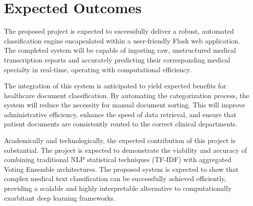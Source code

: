 \chapter{Expected Outcomes}
The proposed project is expected to successfully deliver a robust, automated classification engine encapsulated within a user-friendly Flask web application. The completed system will be capable of ingesting raw, unstructured medical transcription reports and accurately predicting their corresponding medical specialty in real-time, operating with computational efficiency.

The integration of this system is anticipated to yield expected benefits for healthcare document classification. By automating the categorization process, the system will reduce the necessity for manual document sorting. This will improve administrative efficiency, enhance the speed of data retrieval, and ensure that patient documents are consistently routed to the correct clinical departments. 

Academically and technologically, the expected contribution of this project is substantial. The project is expected to demonstrate the viability and accuracy of combining traditional NLP statistical techniques (TF-IDF) with aggregated Voting Ensemble architectures. The proposed system is expected to show that complex medical text classification can be successfully achieved efficiently, providing a scalable and highly interpretable alternative to computationally exorbitant deep learning frameworks.
